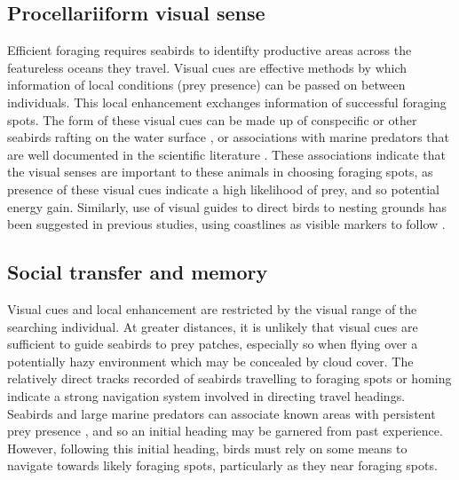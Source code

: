 \documentclass[9pt,twocolumn,twoside,lineno]{pnas-new}
\begin{document}
\subsection{Procellariiform visual sense}
Efficient foraging requires seabirds to identifty productive areas across the featureless oceans they travel. Visual cues are effective methods by which information of local conditions (prey presence) can be passed on between individuals. This local enhancement exchanges information of successful foraging spots. The form of these visual cues can be made up of conspecific or other seabirds rafting on the water surface \citep{Weimerskirch_2010b}, or associations with marine predators that are well documented in the scientific literature \citep{Nevitt_1999, Sakamoto_2009a, Silverman_2004, Thiebot_2012}. These associations indicate that the visual senses are important to these animals in choosing foraging spots, as presence of these visual cues indicate a high likelihood of prey, and so potential energy gain. Similarly, use of visual guides to direct birds to nesting grounds has been suggested in previous studies, using coastlines as visible markers to follow \citep{Pollonara_2015,Yamamoto_2008}.

\subsection{Social transfer and memory}
Visual cues and local enhancement are restricted by the visual range of the searching individual. At greater distances, it is unlikely that visual cues are sufficient to guide seabirds to prey patches, especially so when flying over a potentially hazy environment which may be concealed by cloud cover. The relatively direct tracks recorded of seabirds travelling to foraging spots or homing \citep{Weimerskirch_2007b,Pollonara_2015} indicate a strong navigation system involved in directing travel headings. Seabirds and large marine predators can associate known areas with persistent prey presence \citep{Davoren_2013}, and so an initial heading may be garnered from past experience. However, following this initial heading, birds must rely on some means to navigate towards likely foraging spots, particularly as they near foraging spots.

\end{document}
